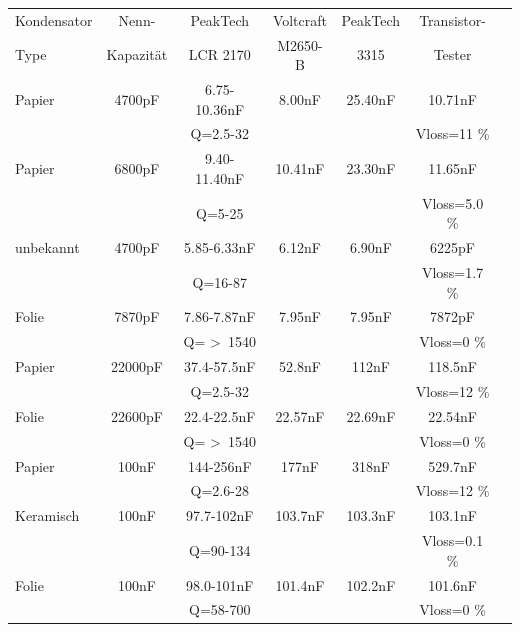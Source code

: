 \begin{tabular}{| l | c | c | c | c | c | c |}
   \hline
Kondensator & Nenn-      & PeakTech     & Voltcraft & PeakTech & Transistor- \\
Type        & Kapazität  & LCR 2170     & M2650-B   &  3315    & Tester      \\
    \hline
    \hline
Papier     & 4700pF      & 6.75-10.36nF & 8.00nF    &  25.40nF &  10.71nF   \\
           &             &  Q=2.5-32    &           &          &  Vloss=11 \% \\
    \hline
Papier     & 6800pF      & 9.40-11.40nF & 10.41nF   &  23.30nF &  11.65nF  \\
           &             &  Q=5-25      &           &          &  Vloss=5.0 \% \\
    \hline
unbekannt  & 4700pF      & 5.85-6.33nF  & 6.12nF    &  6.90nF  &  6225pF  \\
           &             &  Q=16-87     &           &          &  Vloss=1.7 \% \\
    \hline
Folie      & 7870pF      & 7.86-7.87nF  & 7.95nF    &  7.95nF  &  7872pF  \\
           &             &  Q= \textgreater~1540    &           &          &  Vloss=0 \% \\
    \hline
Papier     & 22000pF     & 37.4-57.5nF  & 52.8nF    &  112nF   &  118.5nF \\
           &             &  Q=2.5-32    &           &          &  Vloss=12 \% \\
    \hline
Folie      & 22600pF     & 22.4-22.5nF  & 22.57nF   & 22.69nF  &  22.54nF \\
           &             & Q= \textgreater~1540     &           &          &  Vloss=0 \% \\
    \hline
Papier     & 100nF       & 144-256nF    & 177nF     &  318nF   &  529.7nF \\
           &             & Q=2.6-28     &           &          &  Vloss=12 \% \\
    \hline
Keramisch  & 100nF       & 97.7-102nF   & 103.7nF   & 103.3nF  &  103.1nF \\
           &             & Q=90-134     &           &          &  Vloss=0.1 \% \\
    \hline
Folie      & 100nF       & 98.0-101nF   & 101.4nF   & 102.2nF  &  101.6nF \\
           &             & Q=58-700     &           &          &  Vloss=0 \% \\
    \hline
\end{tabular}

